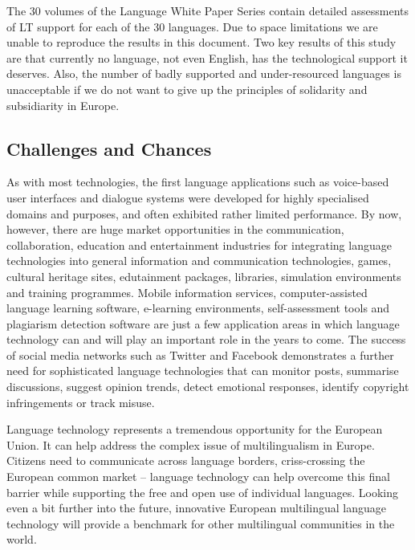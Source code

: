 \documentclass[10pt, plain]{../../metanetpaper}
\begin{document}
\begin{multicols}{2}
The 30 volumes of the Language White Paper Series contain detailed assessments of LT support for each of the 30 languages. Due to space limitations we are unable to reproduce the results in this document. Two key results of this study are that currently no language, not even English, has the technological support it deserves. Also, the number of badly supported and under-resourced languages is unacceptable if we do not want to give up the principles of solidarity and subsidiarity in Europe.

\subsection{Challenges and Chances}
\label{sec:lang-techn-as-a-key-to-the-future}

As with most technologies, the first language applications such as voice-based user interfaces and dialogue systems were developed for highly specialised domains and purposes, and often exhibited rather limited performance. By now, however, there are huge market opportunities in the communication, collaboration, education and entertainment industries for integrating language technologies into general information and communication technologies, games, cultural heritage sites, edutainment packages, libraries, simulation environments and training programmes. Mobile information services, computer-assisted language learning software, e-learning environments, self-assessment tools and plagiarism detection software are just a few application areas in which language technology can and will play an important role in the years to come. The success of social media networks such as Twitter and Facebook demonstrates a further need for sophisticated language technologies that can monitor posts, summarise discussions, suggest opinion trends, detect emotional responses, identify copyright infringements or track misuse.

Language technology represents a tremendous opportunity for the European Union. It can help address the complex issue of multilingualism in Europe. Citizens need to communicate across language borders, criss-crossing the European common market -- language technology can help overcome this final barrier while supporting the free and open use of individual languages. Looking even a bit further into the future, innovative European multilingual language technology will provide a benchmark for other multilingual communities in the world.


\end{multicols}
\end{document}
